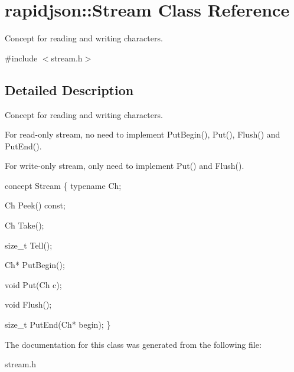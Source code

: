 \hypertarget{a00284}{}\section{rapidjson\+:\+:Stream Class Reference}
\label{a00284}


Concept for reading and writing characters.  




{\ttfamily \#include $<$stream.\+h$>$}



\subsection{Detailed Description}
Concept for reading and writing characters. 

For read-\/only stream, no need to implement Put\+Begin(), Put(), Flush() and Put\+End().

For write-\/only stream, only need to implement Put() and Flush().


\begin{DoxyCode}
concept Stream \{
    \textcolor{keyword}{typename} Ch;    

    Ch Peek() \textcolor{keyword}{const};

    Ch Take();

    \textcolor{keywordtype}{size\_t} Tell();

    Ch* PutBegin();

    \textcolor{keywordtype}{void} Put(Ch c);

    \textcolor{keywordtype}{void} Flush();

    \textcolor{keywordtype}{size\_t} PutEnd(Ch* begin);
\}
\end{DoxyCode}
 

The documentation for this class was generated from the following file\+:\begin{DoxyCompactItemize}
\item 
stream.\+h\end{DoxyCompactItemize}
